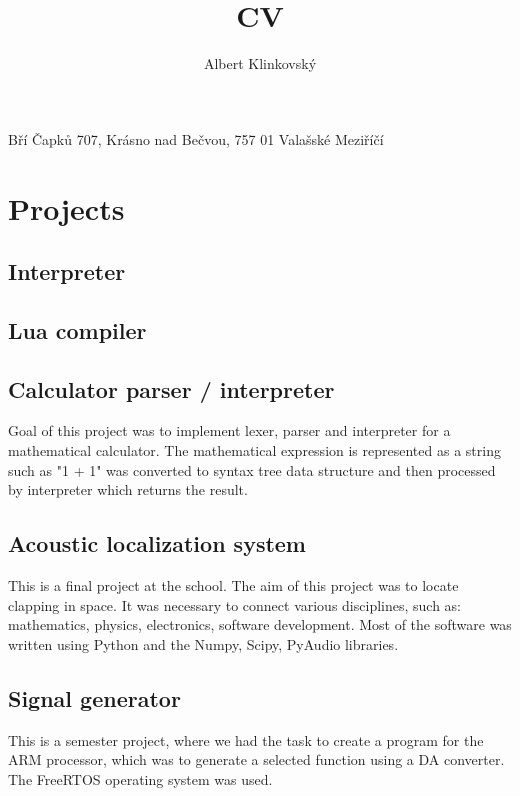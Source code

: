 \documentclass{article}
\renewcommand{\maketitle}{
    \begin{center}
        \Huge\bfseries
        \theauthor

    \end{center}
    \begin{center}
        Bří Čapků 707, Krásno nad Bečvou, 757 01 Valašské Meziříčí
    \end{center}
}
\begin{document}
\title{CV}
\author{Albert Klinkovský}

\maketitle



\section{Projects}

\subsection{Interpreter}

\subsection{Lua compiler}



\subsection{Calculator parser / interpreter}

Goal of this project was to implement lexer, parser and interpreter for a mathematical calculator. The mathematical expression is represented as a string such as "1 + 1" was converted to syntax tree data structure and then processed by interpreter which returns the result.

\subsection{Acoustic localization system}

This is a final project at the school. The aim of this project was to locate clapping in space.  It was necessary to connect various disciplines, such as:  mathematics, physics, electronics, software development. Most of the software was written using Python and the Numpy, Scipy, PyAudio libraries.

\subsection{Signal generator}

This is a semester project, where we had the task to create a program for the ARM processor, which was to generate a selected function using a DA converter.  The FreeRTOS operating system was used.
\end{document}
